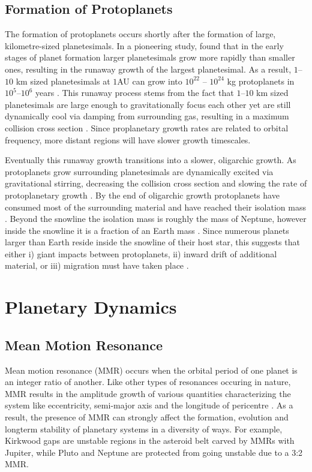 \subsection{Formation of Protoplanets}
The formation of protoplanets occurs shortly after the formation of large, kilometre-sized planetesimals.
In a pioneering study, \citet{Greenberg1978} found that in the early stages of planet formation larger planetesimals grow more rapidly than smaller ones, resulting in the runaway growth of the largest planetesimal. 
As a result, $1$--$10$ km sized planetesimals at $1$AU can grow into $10^{22}$ -- $10^{24}$ kg protoplanets in $10^5$--$10^6$ years \citep{Wetherill1989}.
This runaway process stems from the fact that $1$--$10$ km sized planetesimals are large enough to gravitationally focus each other yet are still dynamically cool via damping from surrounding gas, resulting in a maximum collision cross section \citep{Armitage2010}.
Since proplanetary growth rates are related to orbital frequency, more distant regions will have slower growth timescales.

Eventually this runaway growth transitions into a slower, oligarchic growth. 
As protoplanets grow surrounding planetesimals are dynamically excited via gravitational stirring, decreasing the collision cross section and slowing the rate of protoplanetary growth \citep{Kokubo1998}.
By the end of oligarchic growth protoplanets have consumed most of the surrounding material and have reached their isolation mass \citep{Schlichting2014}.
Beyond the snowline the isolation mass is roughly the mass of Neptune, however inside the snowline it is a fraction of an Earth mass \citep{Schlichting2014}.
Since numerous \kep planets larger than Earth reside inside the snowline of their host star, this suggests that either i) giant impacts between protoplanets, ii) inward drift of additional material, or iii) migration must have taken place \citep{Schlichting2014}.  

\section{Planetary Dynamics}
\subsection{Mean Motion Resonance}
\label{sec:MMR}
Mean motion resonance (MMR) occurs when the orbital period of one planet is an integer ratio of another. 
Like other types of resonances occuring in nature, MMR results in the amplitude growth of various quantities characterizing the system like eccentricity, semi-major axis and the longitude of pericentre \citep{SSD1999}. 
As a result, the presence of MMR can strongly affect the formation, evolution and longterm stability of planetary systems in a diversity of ways.
For example, Kirkwood gaps are unstable regions in the asteroid belt carved by MMRs with Jupiter, while Pluto and Neptune are protected from going unstable due to a 3:2 MMR. 

